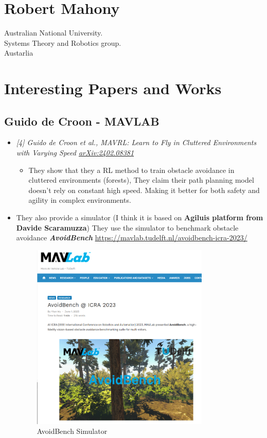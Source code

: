 \documentclass{article}
\begin{document}
\section{Robert Mahony}
Australian National University.
\\Systems Theory and Robotics group.
\\Austarlia


\section{Interesting Papers and Works}

\subsection{Guido de Croon - MAVLAB}
    \begin{itemize}
        \item \textit{[4] Guido de Croon et al., MAVRL: Learn to Fly in Cluttered Environments with Varying Speed \href{https://arxiv.org/abs/2402.08381}{arXiv:2402.08381}}
        \begin{itemize}
            \item They show that they a RL method to train obstacle avoidance in cluttered environments (forests), 
                  They claim their path planning model doesn't rely on constant high speed. Making it better for both safety
                  and agility in complex environments.
        \end{itemize}
        \item They also provide a simulator (I think it is based on \textbf{Agiluis platform from Davide Scaramuzza})
                They use the simulator to benchmark obstacle avoidance \textit{\textbf{AvoidBench}} \href{https://mavlab.tudelft.nl/avoidbench-icra-2023/}{https://mavlab.tudelft.nl/avoidbench-icra-2023/} 
        
        \begin{figure}[H]
            \centering
            \includegraphics[width=0.8\textwidth]{assets/mavlab-avoid-bench.png}
            \caption{AvoidBench Simulator}
            \label{fig:avoidbench}
        \end{figure}
        

\end{itemize}
\end{document}

